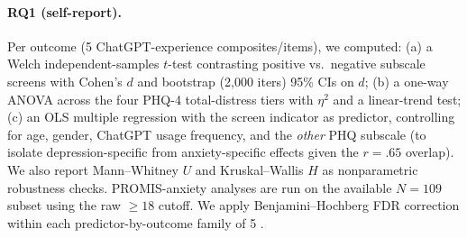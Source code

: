 \documentclass[letterpaper]{article}
\begin{document}
\paragraph{RQ1 (self-report).} Per outcome (5 ChatGPT-experience composites/items), we computed: (a) a Welch independent-samples $t$-test contrasting positive vs.\ negative subscale screens with Cohen's $d$ and bootstrap (2{,}000 iters) 95\% CIs on $d$; (b) a one-way ANOVA across the four PHQ-4 total-distress tiers with $\eta^2$ and a linear-trend test; (c) an OLS multiple regression with the screen indicator as predictor, controlling for age, gender, ChatGPT usage frequency, and the \emph{other} PHQ subscale (to isolate depression-specific from anxiety-specific effects given the $r=.65$ overlap). We also report Mann--Whitney $U$ and Kruskal--Wallis $H$ as nonparametric robustness checks. PROMIS-anxiety analyses are run on the available $N=109$ subset using the raw $\geq 18$ cutoff. We apply Benjamini--Hochberg FDR correction within each predictor-by-outcome family of 5 \citep{benjamini1995fdr}.
\end{document}
